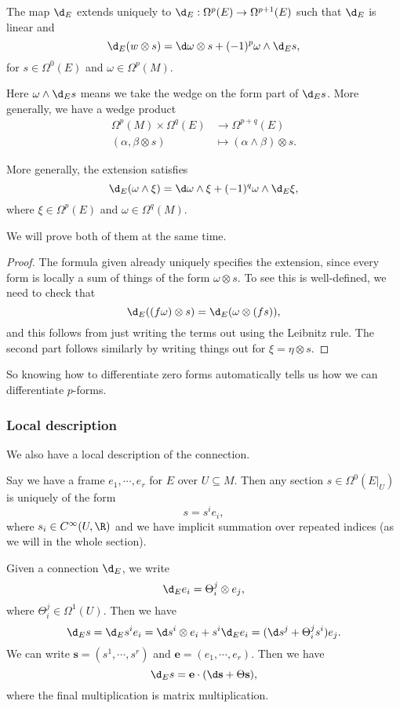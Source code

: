 \documentclass[a4paper]{article}
\begin{document}
\begin{prop}
  The map $\d_E$ extends uniquely to $\d_E: \Omega^p(E) \to \Omega^{p + 1}(E)$ such that $\d_E$ is linear and
  \[
    \d_E(w \otimes s) = \d \omega \otimes s + (-1)^p \omega \wedge \d_E s,
  \]
  for $s \in \Omega^0(E)$ and $\omega \in \Omega^p(M)$.
\end{prop}
Here $\omega \wedge \d_E s$ means we take the wedge on the form part of $\d_E s$. More generally, we have a wedge product
\begin{align*}
  \Omega^p(M) \times \Omega^q(E) &\to \Omega^{p + q}(E)\\
  (\alpha, \beta \otimes s) &\mapsto (\alpha \wedge \beta) \otimes s.
\end{align*}

\begin{prop}
  More generally, the extension satisfies
  \[
    \d_E (\omega \wedge \xi) = \d \omega \wedge \xi + (-1)^q \omega \wedge \d_E \xi,
  \]
  where $\xi \in \Omega^p(E)$ and $\omega \in \Omega^q(M)$.
\end{prop}

We will prove both of them at the same time.
\begin{proof}
  The formula given already uniquely specifies the extension, since every form is locally a sum of things of the form $\omega \otimes s$. To see this is well-defined, we need to check that
  \[
    \d_E ((f \omega) \otimes s) = \d_E (\omega \otimes (fs)),
  \]
  and this follows from just writing the terms out using the Leibnitz rule. The second part follows similarly by writing things out for $\xi = \eta \otimes s$.
\end{proof}
So knowing how to differentiate zero forms automatically tells us how we can differentiate $p$-forms.

\subsubsection*{Local description}
We also have a local description of the connection.

Say we have a frame $e_1, \cdots, e_r$ for $E$ over $U \subseteq M$. Then any section $s \in \Omega^0(E|_U)$ is uniquely of the form
\[
  s = s^i e_i,
\]
where $s_i \in C^\infty(U, \R)$ and we have implicit summation over repeated indices (as we will in the whole section).

Given a connection $\d_E$, we write
\[
  \d_E e_i = \Theta_i^j \otimes e_j,
\]
where $\Theta_i^j \in \Omega^1(U)$. Then we have
\[
  \d_E s = \d_E s^i e_i = \d s^i \otimes e_i + s^i \d_E e_i = (\d s^j + \Theta_i^j s^i) e_j.
\]
We can write $\mathbf{s} = (s^1, \cdots, s^r)$ and $\mathbf{e} = (e_1, \cdots, e_r)$. Then we have
\[
  \d_E s = \mathbf{e} \cdot (\d \mathbf{s} + \Theta \mathbf{s}),
\]
where the final multiplication is matrix multiplication.
\end{document}
